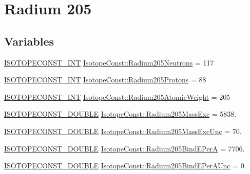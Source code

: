 \hypertarget{group___isotope_const-_radium-_ra205}{}\section{Radium 205}
\label{group___isotope_const-_radium-_ra205}
\subsection*{Variables}
\begin{DoxyCompactItemize}
\item 
\mbox{\hyperlink{group___isotope_const-_macros_ga5f18360b3e99483a35c32d789e62621c}{I\+S\+O\+T\+O\+P\+E\+C\+O\+N\+S\+T\+\_\+\+I\+NT}} \mbox{\hyperlink{group___isotope_const-_radium-_ra205_gab0d1c4cfe0e6ccf8c296807017ca01fe}{Isotope\+Const\+::\+Radium205\+Neutrons}} = 117
\item 
\mbox{\hyperlink{group___isotope_const-_macros_ga5f18360b3e99483a35c32d789e62621c}{I\+S\+O\+T\+O\+P\+E\+C\+O\+N\+S\+T\+\_\+\+I\+NT}} \mbox{\hyperlink{group___isotope_const-_radium-_ra205_ga0780cc7c171ee533c2534b24b6b7e8b1}{Isotope\+Const\+::\+Radium205\+Protons}} = 88
\item 
\mbox{\hyperlink{group___isotope_const-_macros_ga5f18360b3e99483a35c32d789e62621c}{I\+S\+O\+T\+O\+P\+E\+C\+O\+N\+S\+T\+\_\+\+I\+NT}} \mbox{\hyperlink{group___isotope_const-_radium-_ra205_gaeb52f503f21d701251ec1b100e21ffbd}{Isotope\+Const\+::\+Radium205\+Atomic\+Weight}} = 205
\item 
\mbox{\hyperlink{group___isotope_const-_macros_ga8f45a7272ce02c0b4c65c44636ed719a}{I\+S\+O\+T\+O\+P\+E\+C\+O\+N\+S\+T\+\_\+\+D\+O\+U\+B\+LE}} \mbox{\hyperlink{group___isotope_const-_radium-_ra205_ga01c6446f29ea988951e1133da127f03c}{Isotope\+Const\+::\+Radium205\+Mass\+Exc}} = 5838.
\item 
\mbox{\hyperlink{group___isotope_const-_macros_ga8f45a7272ce02c0b4c65c44636ed719a}{I\+S\+O\+T\+O\+P\+E\+C\+O\+N\+S\+T\+\_\+\+D\+O\+U\+B\+LE}} \mbox{\hyperlink{group___isotope_const-_radium-_ra205_ga7061de5d1f48f9671cfbefdd98e70bc6}{Isotope\+Const\+::\+Radium205\+Mass\+Exc\+Unc}} = 70.
\item 
\mbox{\hyperlink{group___isotope_const-_macros_ga8f45a7272ce02c0b4c65c44636ed719a}{I\+S\+O\+T\+O\+P\+E\+C\+O\+N\+S\+T\+\_\+\+D\+O\+U\+B\+LE}} \mbox{\hyperlink{group___isotope_const-_radium-_ra205_gac3a84fc9d303f8a393b5c9e604b220d7}{Isotope\+Const\+::\+Radium205\+Bind\+E\+PerA}} = 7706.
\item 
\mbox{\hyperlink{group___isotope_const-_macros_ga8f45a7272ce02c0b4c65c44636ed719a}{I\+S\+O\+T\+O\+P\+E\+C\+O\+N\+S\+T\+\_\+\+D\+O\+U\+B\+LE}} \mbox{\hyperlink{group___isotope_const-_radium-_ra205_ga488b7144d6575333eb533508afa6766e}{Isotope\+Const\+::\+Radium205\+Bind\+E\+Per\+A\+Unc}} = 0.

\end{DoxyCompactItemize}
